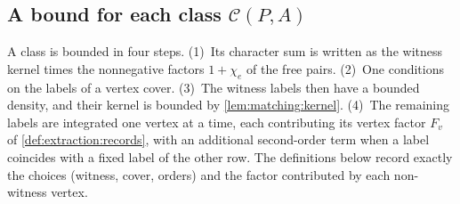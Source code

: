 \subsection{A bound for each class \texorpdfstring{$\mathcal C(P,A)$}{C(P,A)}}\label{subsec:extraction:extraction}

A class is bounded in four steps. (1)~Its character sum is written
as the witness kernel times the nonnegative factors $1+\chi_e$ of
the free pairs. (2)~One conditions on the labels of a vertex
cover. (3)~The witness labels then have a bounded density, and
their kernel is bounded by \cref{lem:matching:kernel}.
(4)~The remaining labels are integrated one vertex at a time,
each contributing its vertex factor $F_v$ of
\cref{def:extraction:records}, with an
additional second-order term when a label coincides with a fixed
label of the other row. The definitions below record exactly the
choices (witness, cover, orders) and the factor contributed by
each non-witness vertex.

